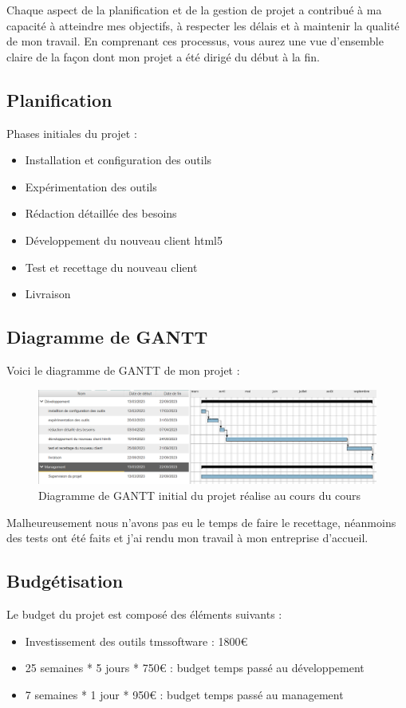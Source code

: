 \documentclass[a4paper, 12pt, french]{article}
\newcommand{\bdot}{\item[\color{ssiYellow}\ding{108}]}
\begin{document}
				Chaque aspect de la planification et de la gestion de projet a contribué à ma capacité à atteindre mes objectifs, à respecter les délais et à maintenir la qualité de mon travail. En comprenant ces processus, vous aurez une vue d'ensemble claire de la façon dont mon projet a été dirigé du début à la fin.

				\subsection{Planification}
					Phases initiales du projet :
					\begin{itemize}
						\bdot{Installation et configuration des outils}
						\bdot{Expérimentation des outils}
						\bdot{Rédaction détaillée des besoins}
						\bdot{Développement du nouveau client \gls{html}5}
						\bdot{Test et recettage du nouveau client}
						\bdot{Livraison}
					\end{itemize}
				
				\subsection{Diagramme de GANTT}
					\noindent Voici le diagramme de GANTT de mon projet :
					\begin{figure}[ht!]
						\begin{center}
							\includegraphics[width=\linewidth]{images/gantt_initial.png}
						\end{center}
						\caption{Diagramme de GANTT initial du projet réalise au cours du cours}
						\label{fig:gantt_initial}
					\end{figure}	
					
					Malheureusement nous n'avons pas eu le temps de faire le recettage, néanmoins des tests ont été faits et j'ai rendu mon travail à mon entreprise d'accueil.

				\subsection{Budgétisation}
					Le budget du projet est composé des éléments suivants :
					\begin{itemize}
						\bdot{Investissement des outils \gls{tmssoftware} : 1800€}
						\bdot{25 semaines * 5 jours * 750€ : budget temps passé au développement}
						\bdot{7 semaines * 1 jour * 950€ : budget temps passé au management}
					\end{itemize}
						
\end{document}
